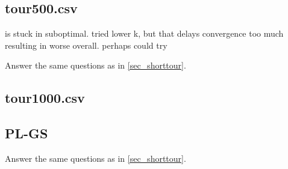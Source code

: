 \documentclass[a4paper,10pt]{article}
\newcommand{\ReplaceMe}[1]{{\color{blue}#1}}
\begin{document}
\subsection{tour500.csv}

is stuck in suboptimal. tried lower k, but that delays convergence too much resulting in worse overall.
perhaps could try 

\ReplaceMe{Answer the same questions as in \cref{sec_shorttour}.}



\subsection{tour1000.csv}


\subsection{PL-GS}


\ReplaceMe{Answer the same questions as in \cref{sec_shorttour}.}
\end{document}
